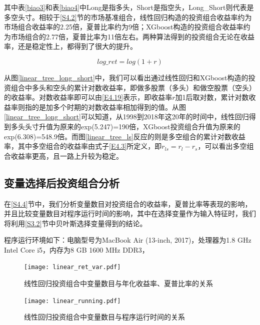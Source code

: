 \documentclass[12pt]{article} %
\begin{document}
	其中表\ref{biao3}和表\ref{biao4}中Long是指多头，Short是指空头，Long\_Short则代表是多空头寸。相较于\ref{S4.2}节的市场基准组合，线性回归构造的投资组合收益率约为市场组合收益率的2.25倍，夏普比率约为9倍；XGboost构造的投资组合收益率约为市场组合的2.77倍，夏普比率为11倍左右。两种算法得到的投资组合无论在收益率，还是稳定性上，都得到了很大的提升。
	
	\begin{equation}
		log\_ret = log(1+r) \label{E4.19}
	\end{equation}
	
	从图\ref{linear_tree_long_short}中，我们可以看出通过线性回归和XGboost构造的投资组合中多头和空头的累计对数收益率，即做多股票（多头）和做空股票（空头）的收益率。对数收益率即可以由\eqref{E4.19}表示，即收益率$r$加1后取对数，累计对数收益率则指的是加多个时期的对数收益率相加得到的值。从图\ref{linear_tree_long_short}可以知道，从1998到2018年这20年的时间中，线性回归得到多头头寸升值为原来的exp(5.247)=190倍，XGboost投资组合升值为原来的exp(6.308)=548.9倍。而图\ref{linear_tree_ls}反应的则是多空组合的累计对数收益率，其中多空组合的收益率由式子\eqref{E4.3}所定义，即$r_{ls}=r_l-r_s$，可以看出多空组合收益率更高，且一路上升较为稳定。
	
	
	
	
	\subsection{变量选择后投资组合分析 \label{S4.4}}
	在\ref{S4.4}节中，我们分析变量数目对投资组合的收益率，夏普比率等表现的影响，并且比较变量数目对程序运行时间的影响，其中在选择变量作为输入特征时，我们将利用\ref{S3.2}节中贝叶斯选择变量得到的结论。
	
	程序运行环境如下：电脑型号为MacBook Air (13-inch, 2017)，处理器为1.8 GHz Intel Core i5，内存为8 GB 1600 MHz DDR3，
	
	
	\begin{figure}[ht]
		
		\centering
		\texttt{[image: linear\_ret\_var.pdf]}
		\caption{线性回归投资组合中变量数目与年化收益率、夏普比率的关系}
		\label{linear_var_ret}
	\end{figure}
	
	\begin{figure}[ht]
		
		\centering
		\texttt{[image: linear\_running.pdf]}
		\caption{线性回归投资组合中变量数目与程序运行时间的关系}
		\label{linear_running}
	\end{figure}
	
\end{document}
